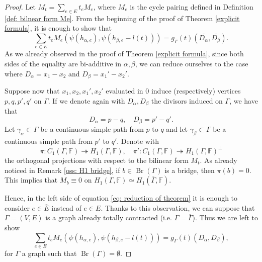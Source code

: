 \documentclass[a4paper,12 pt,titlepage,twoside]{book}
\newcommand{\numberset}{\mathbb}
\newcommand{\F}{\numberset{F}}
\DeclareMathOperator{\br}{Br}
\theoremstyle{plain}
\theoremstyle{theorem}
\theoremstyle{definition}
\theoremstyle{remark}
\begin{document}
	\begin{proof}
		Let $M_t = \sum_{e \in E} t_e M_e$, where $M_e$ is the cycle pairing defined in Definition \ref{def: bilnear form Me}.	From the beginning of the proof of Theorem \ref{explicit formula}, it is enough to show that \begin{equation}\label{eq: reduction of theorem} \sum_{e \in E} t_eM_e (\psi(h_{\alpha,e}), \psi(h_{\beta,e} -l(t))) = g_{\overline{\Gamma}}(t)(\overline{D_\alpha}, \overline{D_\beta}).\end{equation} As we already observed in the proof of Theorem \ref{explicit formula}, since both sides of the equality are bi-additive in $\alpha,\beta$, we can reduce ourselves to the case where $D_\alpha = x_1 - x_2$ and $D_\beta = x_1' - x_2'.$ 
		
		Suppose now that $x_1, x_2, x_1', x_2'$ evaluated in $0$ induce (respectively) vertices $p,q,p',q'$ on $\Gamma.$ If we denote again with $D_\alpha, D_\beta$ the divisors induced on $\Gamma$, we have that $$D_\alpha = p - q, \quad D_\beta = p'-q'.$$ Let $\gamma_\alpha \subset \Gamma$ be a continuous simple path from $p$ to $q$ and let $\gamma_\beta \subset \Gamma$ be a continuous simple path from $p'$ to $q'$. Denote with $$\pi \colon C_1(\Gamma, \F) \twoheadrightarrow H_1(\Gamma,\F), \quad \pi' \colon C_1(\Gamma, \F) \twoheadrightarrow H_1(\Gamma, \F)^\bot$$ the orthogonal projections with respect to the bilinear form $M_t$. As already noticed in Remark \ref{oss: H1 bridge}, if $b \in \br(\Gamma)$ is a bridge, then $\pi(b)=0$. This implies that $M_b \equiv 0$ on $H_1(\Gamma,\F) \simeq H_1(\overline{\Gamma}, \F).$
		
		Hence, in the left side of equation \eqref{eq: reduction of theorem} it is enough to consider $e \in \overline{E}$ instead of $e \in E.$ Thanks to this observation, we can suppose that $\Gamma =(V,E)$ is a graph already totally contracted (i.e. $\Gamma = \overline{\Gamma}$). Thus we are left to show  \begin{equation}\label{eq: reduction of theorem 2}
		\sum_{e \in E} t_eM_e(\psi(h_{\alpha,e}), \psi(h_{\beta,e}-l(t))) = g_\Gamma(t)(D_\alpha, D_\beta),
		\end{equation} for $\Gamma$ a graph such that $\br(\Gamma)= \emptyset.$
		

\end{proof}
\end{document}
